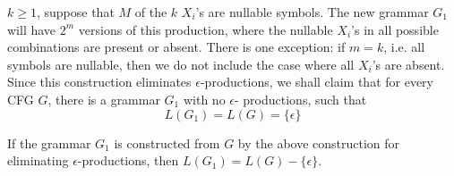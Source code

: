 \documentclass[]{article}
\begin{document}
    $k\geq 1$, suppose that $M$ of the $k$ $X_i$'s are nullable symbols. The new
    grammar $G_1$ will have $2^m$ versions of this production, where the
    nullable $X_i$'s in all possible combinations are present or absent. There
    is one exception: if $m = k$, i.e. all symbols are nullable, then we do not
    include the case where all $X_i$'s are absent. \\
    \indent Since this construction eliminates $\epsilon$-productions, we shall
    claim that for every CFG $G$, there is a grammar $G_1$ with no $\epsilon$-
    productions, such that
      \[ L(G_1) = L(G) = \{\epsilon\} \]
      \begin{thm}
        If the grammar $G_1$ is constructed from $G$ by the above construction
        for eliminating $\epsilon$-productions, then
        $L(G_1) = L(G) - \{\epsilon\}$.
      \end{thm}
\end{document}
